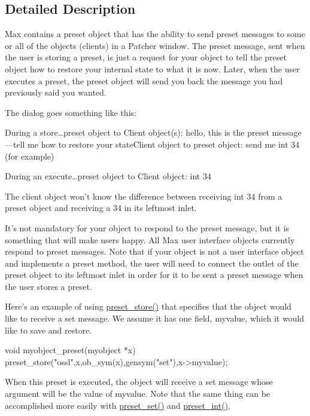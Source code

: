 \subsection{Detailed Description}
Max contains a preset object that has the ability to send preset messages to some or all of the objects (clients) in a Patcher window. The preset message, sent when the user is storing a preset, is just a request for your object to tell the preset object how to restore your internal state to what it is now. Later, when the user executes a preset, the preset object will send you back the message you had previously said you wanted.

The dialog goes something like this:


\begin{DoxyItemize}
\item During a store…preset object to Client object(s): hello, this is the preset message—tell me how to restore your stateClient object to preset object: send me int 34 (for example)
\item During an execute…preset object to Client object: int 34
\end{DoxyItemize}

The client object won’t know the difference between receiving int 34 from a preset object and receiving a 34 in its leftmost inlet.

It’s not mandatory for your object to respond to the preset message, but it is something that will make users happy. All Max user interface objects currently respond to preset messages. Note that if your object is not a user interface object and implements a preset method, the user will need to connect the outlet of the preset object to its leftmost inlet in order for it to be sent a preset message when the user stores a preset.

Here’s an example of using \hyperlink{group__presets_ga5f6d86fdc24e371604b764e7581a4fcb}{preset\_\-store()} that specifies that the object would like to receive a set message. We assume it has one field, myvalue, which it would like to save and restore.


\begin{DoxyCode}
    void myobject_preset(myobject *x) 
    { 
        preset_store("ossl",x,ob_sym(x),gensym("set"),x->myvalue); 
    }
\end{DoxyCode}


When this preset is executed, the object will receive a set message whose argument will be the value of myvalue. Note that the same thing can be accomplished more easily with \hyperlink{group__presets_ga178edd4c9abaecc58ca6379cf2547298}{preset\_\-set()} and \hyperlink{group__presets_gaf1da6073fef8e3f896602cf7f9738a23}{preset\_\-int()}.

